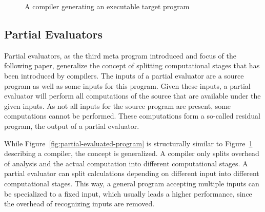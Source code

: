 \begin{figure}
  \centering
  \caption{A compiler generating an executable target program}\label{fig:compiled-program}
\end{figure}



\subsection{Partial Evaluators}

Partial evaluators, as the third meta program introduced and focus of the following paper, generalize the concept of splitting computational stages that has been introduced by compilers.
The inputs of a partial evaluator are a source program as well as some inputs for this program.
Given these inputs, a partial evaluator will perform all computations of the source that are available under the given inputs.
As not all inputs for the source program are present, some computations cannot be performed.
These computations form a so-called residual program, the output of a partial evaluator.

While Figure~\ref{fig:partial-evaluated-program} is structurally similar to Figure~\ref{fig:compiled-program} describing a compiler, the concept is generalized.
A compiler only splits overhead of analysis and the actual computation into different computational stages.
A partial evaluator can split calculations depending on different input into different computational stages.
This way, a general program accepting multiple inputs can be specialized to a fixed input, which usually leads a higher performance, since the overhead of recognizing inputs are removed.

